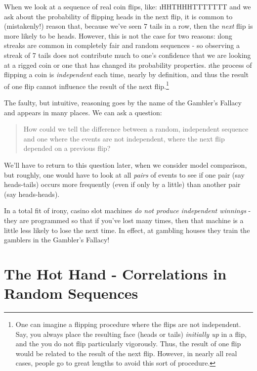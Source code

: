When we look at a sequence of real coin flips, like:
\bi
\i HHTHHHTTTTTTT
\ei
and we ask about the probability of flipping heads in the next flip, it is common to (mistakenly!) reason that, because we've seen 7 tails in a row, then the {\em next} flip is more likely to be heads.  However, this is not the case for two reasons:
\be
\i long streaks are common in completely fair and random sequences - so observing a streak of 7 tails does not contribute much to one's confidence that we are looking at a rigged coin or one that has changed its probability properties.
\i the process of flipping a coin is {\em independent} each time, nearly by definition, and thus the result of one flip cannot influence the result of the next flip.\footnote{One can imagine a flipping procedure where the flips are not independent.  Say, you always place the resulting face (heads or tails) {\em initially up} in a flip, and the you do not flip particularly vigorously.  Thus, the result of one flip would be related to the result of the next flip.  However, in nearly all real cases, people go to great lengths to avoid this sort of procedure.}
\ee

The faulty, but intuitive, reasoning goes by the name of the Gambler's Fallacy and appears in many places.  We can ask a question:\begin{quote}
How could we tell the difference between a random, independent sequence and one where the events are not independent, where the next flip depended on a previous flip?
\end{quote}
We'll have to return to this question later, when we consider model comparison, but roughly, one would have to look at all {\em pairs} of events to see if one pair (say heads-tails) occurs more frequently (even if only by a little) than another pair (say heads-heads).  

In a total fit of irony, casino slot machines \emph{do not produce independent winnings} - they are programmed so that if you've lost many times, then that machine is a little less likely to lose the next time.  In effect, at gambling houses they train the gamblers in the Gambler's Fallacy!


\section{The Hot Hand - Correlations in Random Sequences}

